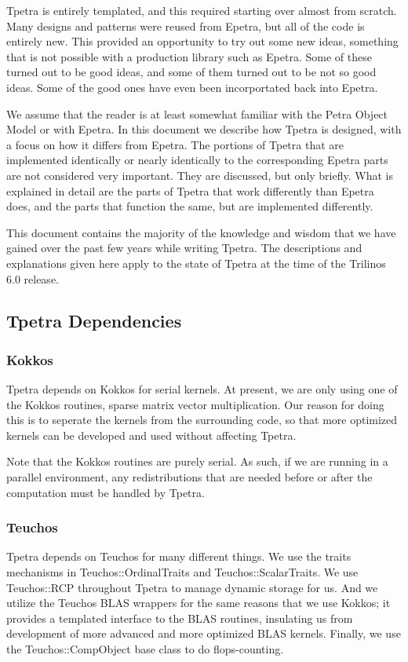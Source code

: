 \documentclass[10pt,relax]{TpetraDesign}
\begin{document}
Tpetra is entirely templated, and this required starting over almost from scratch. Many designs and patterns were reused from Epetra, but all of the code is entirely new. This provided an opportunity to try out some new ideas, something that is not possible with a production library such as Epetra. Some of these turned out to be good ideas, and some of them turned out to be not so good ideas. Some of the good ones have even been incorportated back into Epetra.

We assume that the reader is at least somewhat familiar with the Petra Object Model or with Epetra. In this document we describe how Tpetra is designed, with a focus on how it differs from Epetra. The portions of Tpetra that are implemented identically or nearly identically to the corresponding Epetra parts are not considered very important. They are discussed, but only briefly. What is explained in detail are the parts of Tpetra that work differently than Epetra does, and the parts that function the same, but are implemented differently.

This document contains the majority of the knowledge and wisdom that we have gained over the past few years while writing Tpetra. The descriptions and explanations given here apply to the state of Tpetra at the time of the Trilinos 6.0 release.

%
\subsection{Tpetra Dependencies}

\subsubsection*{Kokkos}
Tpetra depends on Kokkos \cite{Kokkos} for serial kernels. At present, we are only using one of the Kokkos routines, sparse matrix vector multiplication. Our reason for doing this is to seperate the kernels from the surrounding code, so that more optimized kernels can be developed and used without affecting Tpetra.

Note that the Kokkos routines are purely serial. As such, if we are running in a parallel environment, any redistributions that are needed before or after the computation must be handled by Tpetra.

\subsubsection*{Teuchos}
Tpetra depends on Teuchos \cite{Teuchos} for many different things. We use the traits mechanisms in Teuchos::OrdinalTraits and Teuchos::ScalarTraits. We use Teuchos::RCP \cite{RCP} throughout Tpetra to manage dynamic storage for us. And we utilize the Teuchos BLAS wrappers for the same reasons that we use Kokkos; it provides a templated interface to the BLAS routines, insulating us from development of more advanced and more optimized BLAS kernels. Finally, we use the Teuchos::CompObject base class to do flops-counting.
\end{document}

